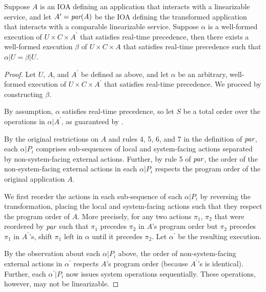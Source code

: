 \begin{theorem}
  Suppose $A$ is an IOA defining an application that interacts with a linearizable service,
  and let $A^\prime = \operatorname*{\textit{par}}(A)$ be the IOA defining the transformed application that
  interacts with a comparable \multidispatch{} linearizable service. Suppose $\alpha$ is a
  well-formed execution of $U \times C \times A^\prime$ that satisfies \multidispatch{} real-time
  precedence, then there exists a well-formed execution $\beta$ of $U \times C \times A$ that
  satisfies \singledispatch{} real-time precedence such that $\alpha | U = \beta | U$.
\end{theorem}

\begin{proof}
  Let $U$, $A$, and $A^\prime$ be defined as above, and let $\alpha$ be an arbitrary,
  well-formed execution of $U \times C \times A^\prime$ that satisfies \multidispatch{}
  real-time precedence. We proceed by constructing $\beta$.

  By assumption, $\alpha$ satisfies \multidispatch{} real-time precedence, so let $S$
  be a total order over the operations in $\alpha | A^\prime$, as guaranteed by \MDL{}.

  By the original restrictions on $A$ and rules 4, 5, 6, and 7 in the definition of $\operatorname*{\textit{par}}$,
  each $\alpha | P_i$ comprises sub-sequences of local and system-facing actions separated by
  non-system-facing external actions. Further, by rule 5 of $\operatorname*{\textit{par}}$, the order of the
  non-system-facing external actions in each $\alpha | P_i$ respects the program order of the
  original application $A$. 

  We first reorder the actions in each sub-sequence of each $\alpha | P_i$ by reversing the
  transformation, placing the local and system-facing actions such that they respect the program
  order of $A$. More precisely, for any two actions $\pi_1$, $\pi_2$ that were reordered by $\operatorname*{\textit{par}}$
  such that $\pi_1$ precedes $\pi_2$ in $A$'s program order but $\pi_2$ precedes $\pi_1$ in $A^\prime$'s,
  shift $\pi_1$ left in $\alpha$ until it precedes $\pi_2$. Let $\alpha^\prime$ be the resulting execution.

  By the observation about each $\alpha | P_i$ above, the order of non-system-facing external actions
  in $\alpha^\prime$ respects $A$'s program order (because $A^\prime$'s is identical). Further,
  each $\alpha^\prime | P_i$ now issues system operations sequentially. These operations, however,
  may not be linearizable.


\end{proof}

